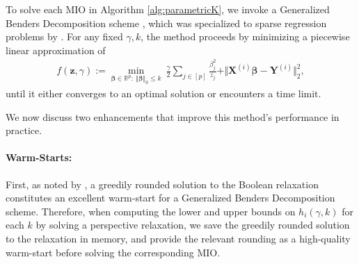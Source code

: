 \documentclass[opre,nonblindrev]{informs3} %
\begin{document}
To solve each MIO in Algorithm \ref{alg:parametricK}, we invoke a Generalized Benders Decomposition scheme \citep{geoffrion1972generalized}, which was specialized to sparse regression problems by \cite{bertsimas2020sparse}. For any fixed $\gamma, k$, the method proceeds by minimizing a piecewise linear approximation of 
\begin{align}
    f(\bm{z}, \gamma):=\min_{\bm{\beta} \in \mathbb{R}^p: \ \Vert \bm{\beta}\Vert_0 \leq k} \ \frac{\gamma}{2}\sum_{j \in [p]}\frac{\beta_j^2}{z_j}+\Vert \bm{X}^{(i)}\bm{\beta}-\bm{Y}^{(i)}\Vert_2^2,\label{prob:persp1}
\end{align}
until it either converges to an optimal solution or encounters a time limit. 

We now discuss two enhancements that improve this method's performance in practice.

\paragraph{Warm-Starts:} First, as noted by \cite{ bertsimas2021unified}, a greedily rounded solution to the Boolean relaxation constitutes an excellent warm-start for a Generalized Benders Decomposition scheme. Therefore, when computing the lower and upper bounds on $h_i(\gamma, k)$ for each $k$ by solving a perspective relaxation, we save the greedily rounded solution to the relaxation in memory, and provide the relevant rounding as a high-quality warm-start before solving the corresponding MIO. 
\end{document}
